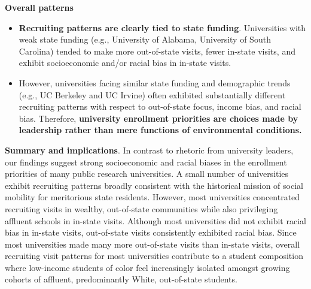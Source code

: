 \documentclass[twoside]{article}
\begin{document}
\begin{color-block}[Findings]
\textbf{Overall patterns}
\begin{itemize}
    \item \textbf{Recruiting patterns are clearly tied to state funding}. Universities with weak state funding (e.g., University of Alabama, University of South Carolina) tended to make more out-of-state visits, fewer in-state visits, and exhibit socioeconomic and/or racial bias in in-state visits. %
    \item However, universities facing similar state funding and demographic trends (e.g., UC Berkeley and UC Irvine) often exhibited substantially different recruiting patterns with respect to out-of-state focus, income bias, and racial bias. Therefore, \textbf{university enrollment priorities are choices made by leadership rather than mere functions of environmental conditions.} 
\end{itemize}  

\end{color-block}

\textbf{Summary and implications}. In contrast to rhetoric from university leaders, our findings suggest strong socioeconomic and racial biases in the enrollment priorities of many public research universities. A small number of universities exhibit recruiting patterns broadly consistent with the historical mission of social mobility for meritorious state residents. However, most universities concentrated recruiting visits in wealthy, out-of-state communities while also privileging affluent schools in in-state visits. Although most universities did not exhibit racial bias in in-state visits, out-of-state visits consistently exhibited racial bias. Since most universities made many more out-of-state visits than in-state visits, overall recruiting visit patterns for most universities contribute to a student composition where low-income students of color feel increasingly isolated amongst growing cohorts of affluent, predominantly White, out-of-state students.
\end{document}
